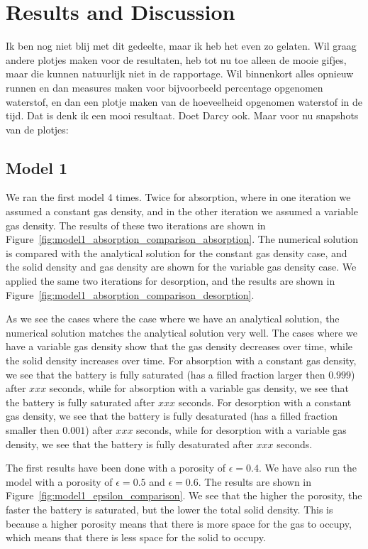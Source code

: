 \section{Results and Discussion}\label{sec:results}
Ik ben nog niet blij met dit gedeelte, maar ik heb het even zo gelaten. Wil graag andere plotjes maken voor de resultaten, heb tot nu toe alleen de mooie gifjes, maar die kunnen natuurlijk niet in de rapportage. Wil binnenkort alles opnieuw runnen en dan measures maken voor bijvoorbeeld percentage opgenomen waterstof, en dan een plotje maken van de hoeveelheid opgenomen waterstof in de tijd. Dat is denk ik een mooi resultaat. Doet Darcy ook. Maar voor nu snapshots van de plotjes:

\subsection{Model 1}
We ran the first model 4 times. Twice for absorption, where in one iteration we assumed a constant gas density, and in the other iteration we assumed a variable gas density. The results of these two iterations are shown in Figure~\ref{fig:model1_absorption_comparison_absorption}. The numerical solution is compared with the analytical solution for the constant gas density case, and the solid density and gas density are shown for the variable gas density case. We applied the same two iterations for desorption, and the results are shown in Figure~\ref{fig:model1_absorption_comparison_desorption}. 

As we see the cases where the case where we have an analytical solution, the numerical solution matches the analytical solution very well. The cases where we have a variable gas density show that the gas density decreases over time, while the solid density increases over time. For absorption with a constant gas density, we see that the battery is fully saturated (has a filled fraction larger then $0.999$) after $xxx$ seconds, while for absorption with a variable gas density, we see that the battery is fully saturated after $xxx$ seconds. For desorption with a constant gas density, we see that the battery is fully desaturated (has a filled fraction smaller then $0.001$) after $xxx$ seconds, while for desorption with a variable gas density, we see that the battery is fully desaturated after $xxx$ seconds. 

The first results have been done with a porosity of $\epsilon=0.4$. We have also run the model with a porosity of $\epsilon=0.5$ and $\epsilon=0.6$. The results are shown in Figure~\ref{fig:model1_epsilon_comparison}. We see that the higher the porosity, the faster the battery is saturated, but the lower the total solid density. This is because a higher porosity means that there is more space for the gas to occupy, which means that there is less space for the solid to occupy.


